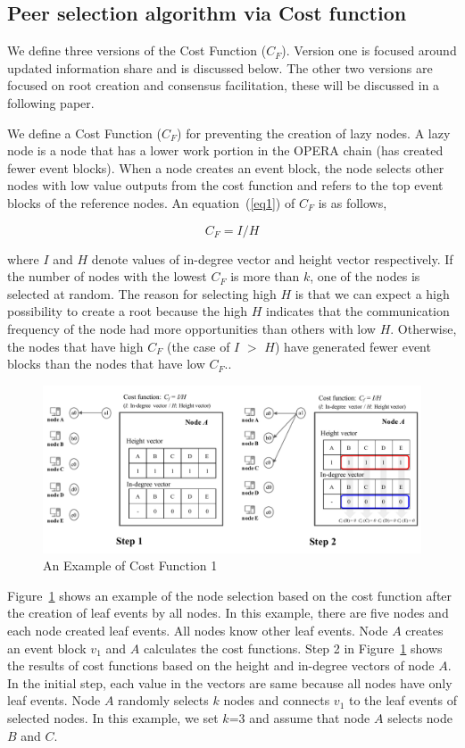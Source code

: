 \documentclass{article}
\begin{document}
\subsection{Peer selection algorithm via Cost function}
We define three versions of the Cost Function ($C_F$). Version one is focused around updated information share and is discussed below. The other two versions are focused on root creation and consensus facilitation, these will be discussed in a following paper.


We define a Cost Function ($C_F$) for preventing the creation of lazy nodes. A lazy node is a node that has a lower work portion in the OPERA chain (has created fewer event blocks). When a node creates an event block, the node selects other nodes with low value outputs from the cost function and refers to the top event blocks of the reference nodes. An equation~(\ref{eq1}) of $C_F$ is as follows,

\begin{equation}\label{eq1}
C_{F} =I/H
\end{equation}

where $I$ and $H$ denote values of in-degree vector and height vector respectively. If the number of nodes with the lowest $C_F$ is more than $k$, one of the nodes is selected at random. The reason for selecting high $H$ is that we can expect a high possibility to create a root because the high $H$ indicates that the communication frequency of the node had more opportunities than others with low $H$. Otherwise, the nodes that have high $C_F$ (the case of $I$ $>$ $H$) have generated fewer event blocks than the nodes that have low $C_F$.. 

\begin{figure}[H] \centering  
\includegraphics[width=.8\textwidth]{costfunction_1.pdf}
\caption{An Example of Cost Function 1}
\label{fig:costfunction_1}
\end{figure}

Figure~\ref{fig:costfunction_1} shows an example of the node selection based on the cost function after the creation of leaf events by all nodes. In this example, there are five nodes and each node created leaf events. All nodes know other leaf events. Node $A$ creates an event block $v_1$ and $A$ calculates the cost functions. Step 2 in Figure~\ref{fig:costfunction_1} shows the results of cost functions based on the height and in-degree vectors of node $A$. In the initial step, each value in the vectors are same because all nodes have only leaf events. Node $A$ randomly selects $k$ nodes and connects $v_1$ to the leaf events of selected nodes. In this example, we set $k$=3 and assume that node $A$ selects node $B$ and $C$. 
\end{document}
